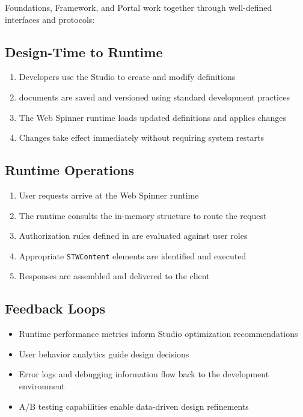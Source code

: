 Foundations, Framework, and Portal work together through well-defined interfaces and protocols:

\subsection{Design-Time to Runtime}

\begin{enumerate}
	\item Developers use the Studio to create and modify \webbase{} definitions
	\item \wbol{} documents are saved and versioned using standard development practices
	\item The Web Spinner runtime loads updated \webbase{} definitions and applies changes
	\item Changes take effect immediately without requiring system restarts
\end{enumerate}

\subsection{Runtime Operations}

\begin{enumerate}
	\item User requests arrive at the Web Spinner runtime
	\item The runtime consults the in-memory \webbase{} structure to route the request
	\item Authorization rules defined in \wbol{} are evaluated against user roles
	\item Appropriate \texttt{STWContent} elements are identified and executed
	\item Responses are assembled and delivered to the client
\end{enumerate}

\subsection{Feedback Loops}

\begin{itemize}
	\item Runtime performance metrics inform Studio optimization recommendations
	\item User behavior analytics guide design decisions
	\item Error logs and debugging information flow back to the development environment
	\item A/B testing capabilities enable data-driven design refinements
\end{itemize}

